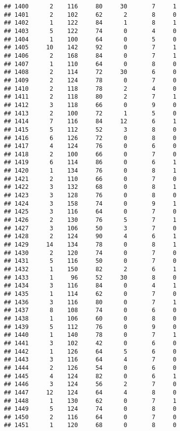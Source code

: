 \documentclass[
]{article}
\begin{document}
\begin{verbatim}
## 1400      2    116     80     30       7     1
## 1401      2    102     62      2       8     0
## 1402      1    122     84      1       8     1
## 1403      5    122     74      0       4     0
## 1404      1    100     64      0       5     0
## 1405     10    142     92      0       7     1
## 1406      2    168     84      0       7     1
## 1407      1    110     64      0       8     0
## 1408      2    114     72     30       6     0
## 1409      2    124     78      0       7     0
## 1410      2    118     78      2       4     0
## 1411      2    118     80      2       7     1
## 1412      3    118     66      0       9     0
## 1413      2    100     72      1       5     0
## 1414      7    116     84     12       6     1
## 1415      5    112     52      3       8     0
## 1416      6    126     72      0       8     0
## 1417      4    124     76      0       6     0
## 1418      2    100     66      0       7     0
## 1419      6    114     86      0       6     1
## 1420      1    134     76      0       8     1
## 1421      2    110     66      0       7     0
## 1422      3    132     68      0       8     1
## 1423      3    128     76      0       8     0
## 1424      3    158     74      0       9     1
## 1425      3    116     64      0       7     0
## 1426      2    130     76      5       7     1
## 1427      3    106     50      3       7     0
## 1428      2    124     90      4       6     1
## 1429     14    134     78      0       8     1
## 1430      2    120     74      0       7     0
## 1431      5    116     50      0       7     0
## 1432      1    150     82      2       6     1
## 1433      1     96     52     30       8     0
## 1434      3    116     84      0       4     1
## 1435      1    114     62      0       7     0
## 1436      3    116     80      0       7     1
## 1437      8    108     74      0       6     0
## 1438      1    106     60      0       8     0
## 1439      5    112     76      0       9     0
## 1440      1    140     78      0       7     1
## 1441      3    102     42      0       6     0
## 1442      1    126     64      5       6     0
## 1443      3    116     64      4       7     0
## 1444      2    126     54      0       6     0
## 1445      4    124     82      0       6     1
## 1446      3    124     56      2       7     0
## 1447     12    124     64      4       8     0
## 1448      1    130     62      0       7     1
## 1449      5    124     74      0       8     0
## 1450      2    116     64      0       7     0
## 1451      1    120     68      0       8     0

\end{verbatim}
\end{document}

